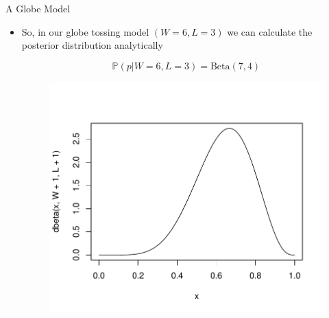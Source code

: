 \documentclass[handout]{beamer}
\begin{document}
\begin{frame}{A Globe Model}
\scriptsize{

\begin{itemize}


\item So, in our globe tossing model $(W=6,L=3)$ we can calculate the posterior distribution analytically 

\begin{displaymath}
\mathbb{P}(p|W=6,L=3) =  \text{Beta}(7,4) 
\end{displaymath}


\begin{figure}[h!]
	\centering
	\includegraphics[scale=0.55]{pics/beta(7,4).pdf}
\end{figure}



\end{itemize}

} 

\end{frame}
\end{document}
